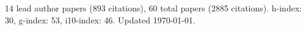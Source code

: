14 lead author papers (893 citations),
60 total papers (2885 citations).\newline
h-index: 30, g-index: 53, i10-index: 46. Updated \today.